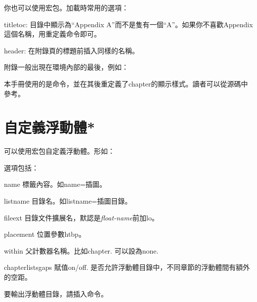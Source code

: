 你也可以使用宏包。加載時常用的選項：
\begin{para}
\item[titletoc:] 目錄中顯示為``Appendix A''而不是隻有一個``A''。如果你不喜歡Appendix這個名稱，用重定義命令即可。
\item[header:] 在附錄頁的標題前插入同樣的名稱。
\end{para}

附錄一般出現在環境內部的最後，例如：
\begin{latex}
\end{latex}

本手冊使用的是命令，並在其後重定義了chapter的顯示樣式。讀者可以從源碼中參考。

\section{自定義浮動體*}
可以使用宏包自定義浮動體。形如：
\begin{latex}
\end{latex}

選項包括：
\begin{para}
\item[name] 標籤內容。如name=插圖。
\item[listname] 目錄名。如listname=插圖目錄。
\item[fileext] 目錄文件擴展名，默認是\textit{float-name}前加lo。
\item[placement] 位置參數htbp。
\item[within] 父計數器名稱。比如chapter. 可以設為none.
\item[chapterlistsgaps] 賦值on/off. 是否允許浮動體目錄中，不同章節的浮動體間有額外的空距。
\end{para}

要輸出浮動體目錄，請插入命令。

